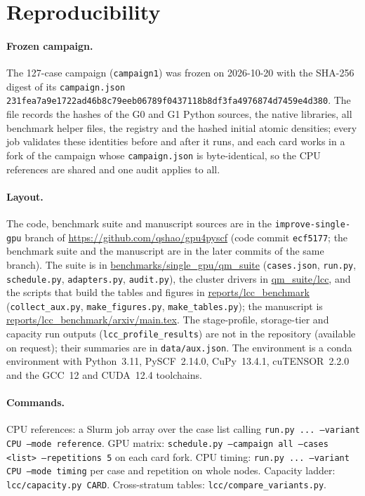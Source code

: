 \appendix
\section{Reproducibility}
\label{sec:repro}

\paragraph{Frozen campaign.} The 127-case campaign (\texttt{campaign1}) was frozen on 2026-10-20 with the SHA-256 digest of its \texttt{campaign.json} \texttt{\scriptsize 231fea7a9e1722ad46b8c79eeb06789f0437118b8df3fa4976874d7459e4d380}. The file records the hashes of the G0 and G1 Python sources, the native libraries, all benchmark helper files, the registry and the hashed initial atomic densities; every job validates these identities before and after it runs, and each card works in a fork of the campaign whose \texttt{campaign.json} is byte-identical, so the CPU references are shared and one audit applies to all.

\paragraph{Layout.}
The code, benchmark suite and manuscript sources are in the \texttt{improve-single-gpu} branch of \url{https://github.com/qshao/gpu4pyscf} (code commit \texttt{ecf5177}; the benchmark suite and the manuscript are in the later commits of the same branch). The suite is in \url{benchmarks/single_gpu/qm_suite} (\texttt{cases.json}, \texttt{run.py}, \texttt{schedule.py}, \texttt{adapters.py}, \texttt{audit.py}), the cluster drivers in \url{qm_suite/lcc}, and the scripts that build the tables and figures in \url{reports/lcc_benchmark} (\texttt{collect\_aux.py}, \texttt{make\_figures.py}, \texttt{make\_tables.py}); the manuscript is \url{reports/lcc_benchmark/arxiv/main.tex}. The stage-profile, storage-tier and capacity run outputs (\texttt{lcc\_profile\_results}) are not in the repository (available on request); their summaries are in \texttt{data/aux.json}. The environment is a conda environment with Python~3.11, PySCF~2.14.0, CuPy~13.4.1, cuTENSOR~2.2.0 and the GCC~12 and CUDA~12.4 toolchains.

\paragraph{Commands.} CPU references: a Slurm job array over the case list calling \texttt{run.py ... --variant CPU --mode reference}. GPU matrix: \texttt{schedule.py --campaign all --cases <list> --repetitions 5} on each card fork. CPU timing: \texttt{run.py ... --variant CPU --mode timing} per case and repetition on whole nodes. Capacity ladder: \texttt{lcc/capacity.py CARD}. Cross-stratum tables: \texttt{lcc/compare\_variants.py}.

